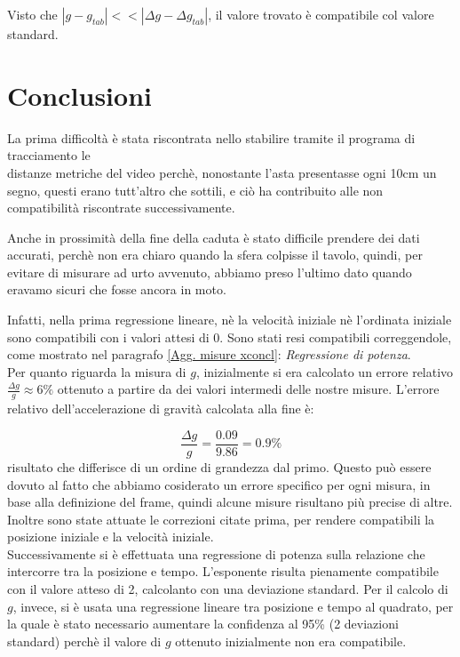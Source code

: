 \documentclass[12pt, a4paper]{article}
\begin{document}
Visto che $|g-g_{tab}|<< |\Delta g-\Delta g_{tab}|$, il valore trovato è compatibile col valore standard.


\section{Conclusioni}
La prima difficoltà è stata riscontrata nello stabilire tramite il programa di tracciamento le \\
distanze metriche del video perchè, nonostante l'asta presentasse ogni 10cm un segno, questi erano tutt'altro che sottili, e ciò ha contribuito alle non compatibilità riscontrate successivamente. 

Anche in prossimità della fine della caduta è stato difficile prendere dei dati accurati, perchè non era chiaro quando la sfera colpisse il tavolo, quindi, per evitare di misurare ad urto avvenuto, abbiamo preso l'ultimo dato quando eravamo sicuri che fosse ancora in moto.

Infatti, nella prima regressione lineare, nè la velocità iniziale nè l'ordinata iniziale sono compatibili con i valori attesi di 0. Sono stati resi compatibili correggendole, come mostrato nel paragrafo \ref{Agg. misure xconcl}: \textit{Regressione di potenza}.\\

Per quanto riguarda la misura di $g$, inizialmente si era calcolato un errore relativo $\frac{\Delta g}{g}\approx 6\% $ ottenuto a partire da dei valori intermedi delle nostre misure. L'errore relativo dell'accelerazione di gravità calcolata alla fine è:

\begin{equation*}
    \frac{\Delta g}{g}=\frac{0.09}{9.86}=0.9\%
\end{equation*}
risultato che differisce di un ordine di grandezza dal primo. Questo può essere dovuto al fatto che abbiamo cosiderato un errore specifico per ogni misura, in base alla definizione del frame, quindi alcune misure risultano più precise di altre. Inoltre sono state attuate le correzioni citate prima, per rendere compatibili  la posizione iniziale e la velocità iniziale. \\


Successivamente si è effettuata una regressione di potenza sulla relazione che intercorre tra la posizione e tempo. L'esponente risulta pienamente compatibile con il valore atteso di 2, calcolanto con una deviazione standard.
Per il calcolo di $g$, invece, si è usata una regressione lineare tra posizione e tempo al quadrato, per la quale è stato necessario aumentare la confidenza al 95\% (2 deviazioni standard) perchè il valore di $g$ ottenuto inizialmente non era compatibile. \\
\end{document}
